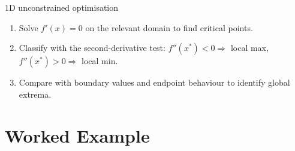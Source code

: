 \begin{rulebox}{1D unconstrained optimisation}
\begin{enumerate}[leftmargin=1.6em,itemsep=0.3ex]
  \item Solve $f'(x)=0$ on the relevant domain to find critical points.
  \item Classify with the second-derivative test: $f''(x^*)<0 \Rightarrow$
        local max, $f''(x^*)>0 \Rightarrow$ local min.
  \item Compare with boundary values and endpoint behaviour to identify
        global extrema.
\end{enumerate}
\end{rulebox}

\section{Worked Example}

